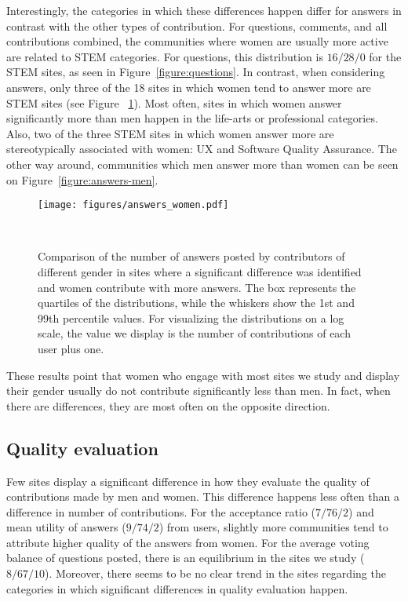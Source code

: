 Interestingly, the categories in which these differences happen differ for answers in contrast with the other types of contribution. For questions, comments, and all contributions combined, the communities where women are usually more active are related to STEM categories. For questions, this distribution is $16/28/0$ for the STEM sites, as seen in Figure~\ref{figure:questions}. In contrast, when considering answers, only three of the 18 sites in which women tend to answer more are STEM sites (see Figure ~\ref{figure:answers}). Most often, sites in which women answer significantly more than men happen in the life-arts or professional categories. Also, two of the three STEM sites in which women answer more are stereotypically associated with women: UX and Software Quality Assurance. The other way around, communities which men answer more than women can be seen on Figure~\ref{figure:answers-men}.

\begin{figure}
  \raggedleft
  \texttt{[image: figures/answers\_women.pdf]}
  \caption{Comparison of the number of answers posted by contributors of different gender in sites where a significant difference was identified and women contribute with more answers. The box represents the quartiles of the distributions, while the whiskers show the 1st and 99th percentile values. For visualizing the distributions on a log scale, the value we display is the number of contributions of each user plus one. }~\label{figure:answers}
\end{figure}

These results point that women who engage with most sites we study and display their gender usually do not contribute significantly less than men. In fact, when there are differences, they are most often on the opposite direction. 

\subsection{Quality evaluation} %
\label{subsec:qualidade}
Few sites display a significant difference in how they evaluate the quality of contributions made by men and women. This difference happens less often than a difference in number of contributions. For the acceptance ratio ($7/76/2$) and mean utility of answers ($9/74/2$) from users, slightly more communities tend to attribute higher quality of the answers from women. For the average voting balance of questions posted, there is an equilibrium in the sites we study ($8/67/10$). Moreover, there seems to be no clear trend in the sites regarding the categories in which significant differences in quality evaluation happen. 

